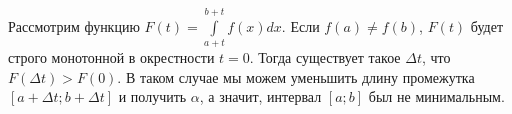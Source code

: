 \documentclass{article}
\begin{document}
Рассмотрим функцию $F(t) = \int\limits_{a+t}^{b+t} f(x) dx$. Если $f(a) \neq f(b)$, $F(t)$ будет строго монотонной в окрестности $t=0$. Тогда существует такое $\Delta t$, что $F(\Delta t) > F(0)$. В таком случае мы можем уменьшить длину промежутка $[a+\Delta t; b + \Delta t]$ и получить $\alpha$, а значит, интервал $[a;b]$ был не минимальным.
\end{document}
